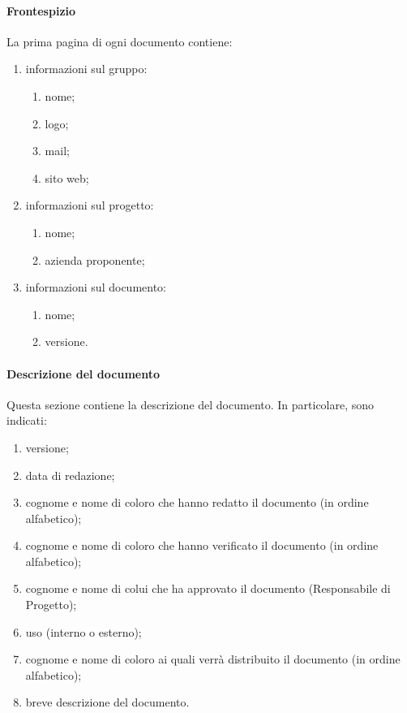 			\paragraph{Frontespizio}
				La prima pagina di ogni documento contiene:
				\begin{enumerate}
					\item informazioni sul gruppo:
					\begin{enumerate}
						\item nome;
						\item logo;
						\item mail;
						\item sito web;
					\end{enumerate}
					\item informazioni sul progetto:
					\begin{enumerate}
						\item nome;
						\item azienda proponente;
					\end{enumerate}
					\item informazioni sul documento:
					\begin{enumerate}
						\item nome;
						\item versione.
					\end{enumerate}
				\end{enumerate}
			\paragraph{Descrizione del documento}
				Questa sezione contiene la descrizione del documento. In particolare, sono indicati:
				\begin{enumerate}
					\item versione;
					\item data di redazione;
					\item cognome e nome di coloro che hanno redatto il documento (in ordine alfabetico);
					\item cognome e nome di coloro che hanno verificato il documento (in ordine alfabetico);
					\item cognome e nome di colui che ha approvato il documento (Responsabile di Progetto);
					\item uso (interno o esterno);
					\item cognome e nome di coloro ai quali verrà distribuito il documento (in ordine alfabetico);
					\item breve descrizione del documento.
				\end{enumerate}
